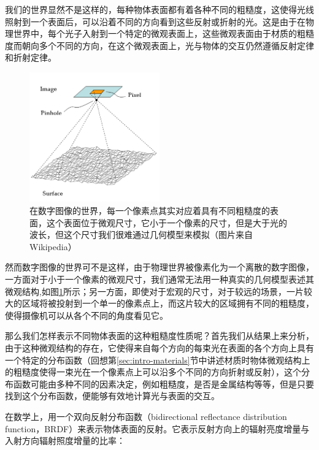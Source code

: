 我们的世界显然不是这样的，每种物体表面都有着各种不同的粗糙度，这使得光线照射到一个表面后，可以沿着不同的方向看到这些反射或折射的光。这是由于在物理世界中，每个光子入射到一个特定的微观表面上，这些微观表面由于材质的粗糙度而朝向多个不同的方向，在这个微观表面上，光与物体的交互仍然遵循反射定律和折射定律。

\begin{figure}
\sidecaption
	\includegraphics[width=0.5\textwidth]{figures/intro/surface-roughness}
	\caption{在数字图像的世界，每一个像素点其实对应着具有不同粗糙度的表面，这个表面位于微观尺寸，它小于一个像素的尺寸，但是大于光的波长，但这个尺寸我们很难通过几何模型来模拟（图片来自Wikipedia）}
	\label{f:intro-surface-roughness}
\end{figure}

然而数字图像的世界可不是这样，由于物理世界被像素化为一个离散的数字图像，一方面对于小于一个像素的微观尺寸，我们通常无法用一种真实的几何模型表述其微观结构,如图\ref{f:intro-surface-roughness}所示；另一方面，即使对于宏观的尺寸，对于较远的场景，一片较大的区域将被投射到一个单一的像素点上，而这片较大的区域拥有不同的粗糙度，使得摄像机可以从各个不同的角度看见它。

那么我们怎样表示不同物体表面的这种粗糙度性质呢？首先我们从结果上来分析，由于这种微观结构的存在，它使得来自每个方向的每束光在表面的各个方向上具有一个特定的分布函数（回想第\ref{sec:intro-materials}节中讲述材质时物体微观结构上的粗糙度使得一束光在一个像素点上可以沿多个不同的方向折射或反射），这个分布函数可能由多种不同的因素决定，例如粗糙度，是否是金属结构等等，但是只要找到这个分布函数，便能够有效地计算光与表面的交互。

在数学上，用一个双向反射分布函数（bidirectional reflectance distribution function，BRDF）\cite{a:DirectionalReflectanceandEmissivityofanOpaqueSurface}来表示物体表面的反射。它表示反射方向上的辐射亮度增量与入射方向辐射照度增量的比率：


